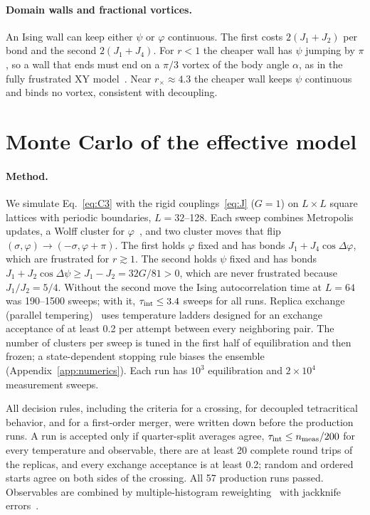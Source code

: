 \documentclass[pre,reprint,superscriptaddress,longbibliography,amsmath,amssymb,floatfix]{revtex4-2}
\begin{document}
\paragraph*{Domain walls and fractional vortices.} An Ising wall can keep either $\psi$ or $\varphi$ continuous. The first costs $2(J_1+J_2)$ per bond and the second $2(J_1+J_4)$. For $r<1$ the cheaper wall has $\psi$ jumping by $\pi$, so a wall that ends must end on a $\pi/3$ vortex of the body angle $\alpha$, as in the fully frustrated XY model~\cite{Korshunov2006}. Near $r_\times\approx4.3$ the cheaper wall keeps $\psi$ continuous and binds no vortex, consistent with decoupling.

\section{Monte Carlo of the effective model}\label{sec:mc}

\paragraph*{Method.} We simulate Eq.~\eqref{eq:C3} with the rigid couplings~\eqref{eq:J} ($G=1$) on $L\times L$ square lattices with periodic boundaries, $L=32$--128. Each sweep combines Metropolis updates, a Wolff cluster for $\varphi$~\cite{Wolff1989}, and two cluster moves that flip $(\sigma,\varphi)\to(-\sigma,\varphi+\pi)$. The first holds $\varphi$ fixed and has bonds $J_1+J_4\cos\Delta\varphi$, which are frustrated for $r\gtrsim1$. The second holds $\psi$ fixed and has bonds $J_1+J_2\cos\Delta\psi\ge J_1-J_2=32G/81>0$, which are never frustrated because $J_1/J_2=5/4$. Without the second move the Ising autocorrelation time at $L=64$ was 190--1500 sweeps; with it, $\tau_{\rm int}\le3.4$ sweeps for all runs. Replica exchange (parallel tempering)~\cite{HukushimaNemoto1996} uses temperature ladders designed for an exchange acceptance of at least 0.2 per attempt between every neighboring pair. The number of clusters per sweep is tuned in the first half of equilibration and then frozen; a state-dependent stopping rule biases the ensemble (Appendix~\ref{app:numerics}). Each run has $10^3$ equilibration and $2\times10^4$ measurement sweeps.

All decision rules, including the criteria for a crossing, for decoupled tetracritical behavior, and for a first-order merger, were written down before the production runs. A run is accepted only if quarter-split averages agree, $\tau_{\rm int}\le n_{\rm meas}/200$ for every temperature and observable, there are at least 20 complete round trips of the replicas, and every exchange acceptance is at least 0.2; random and ordered starts agree on both sides of the crossing. All 57 production runs passed. Observables are combined by multiple-histogram reweighting~\cite{FerrenbergSwendsen1989} with jackknife errors~\cite{MadrasSokal1988}.
\end{document}
